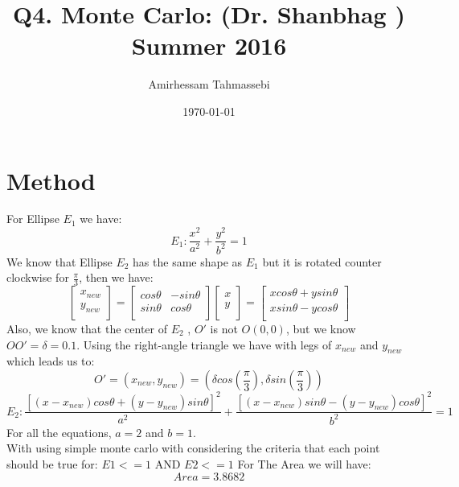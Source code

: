 \documentclass[a4paper]{article}
\title{Q4. Monte Carlo: (Dr. Shanbhag )\\Summer 2016}
\author{Amirhessam Tahmassebi}
\date{\today}
\begin{document}
\maketitle


 

\section*{Method}


For Ellipse $E_1$ we have: \\

$$E_1 : \frac{x^2}{a^2} + \frac{y^2}{b^2} = 1$$
We know that Ellipse $E_2$ has the same shape as $E_1$ but it is rotated counter clockwise for $\frac{\pi}{3}$, then we have: \\
$$\begin{bmatrix}
    x_{new}  \\
    y_{new}  \\
   
\end{bmatrix}
 = \begin{bmatrix}
    cos\theta & -sin\theta  \\
    sin\theta & cos\theta  \\
   
\end{bmatrix} 
\begin{bmatrix}
    x \\
    y\\
   
\end{bmatrix}
= \begin{bmatrix}
    xcos\theta + ysin\theta \\
    xsin\theta - ycos\theta \\
   
\end{bmatrix}
$$
Also, we know that the center of $E_2$ , $O'$ is not $ O (0,0)$, but we know $OO' =\delta = 0.1 $. Using the right-angle triangle we have with legs of $x_{new}$ and $y_{new}$ which leads us to: 
$$O' =(x_{new},y_{new}) = (\delta cos(\frac{\pi}{3}) , \delta sin(\frac{\pi}{3}))$$
$$E_2 :  \frac{[(x-x_{new})cos\theta + (y-y_{new})sin\theta]^2}{a^2} +
\frac{[(x-x_{new})sin\theta - (y-y_{new})cos\theta]^2}{b^2} = 1$$
For all the equations, $ a = 2 $ and $ b =1$. \\
With using simple monte carlo with considering the criteria that each point should be true for:  $E1 <= 1$ AND $E2 <=1$
For The Area we will have:
$$Area = 3.8682 $$
\end{document}
